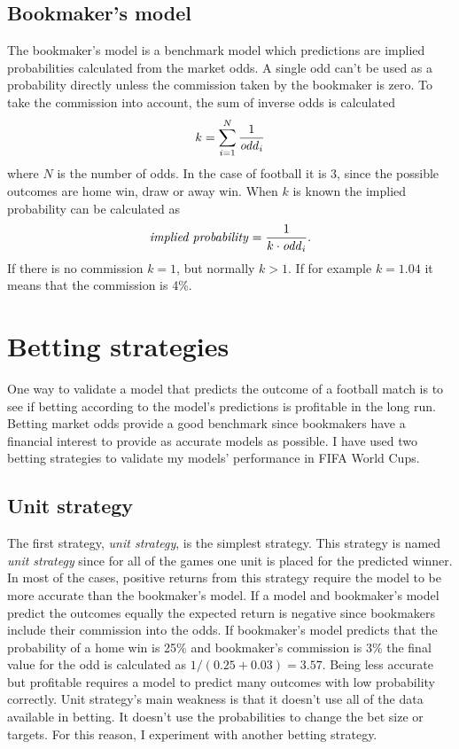 \subsection{Bookmaker's model}
The bookmaker's model is a benchmark model which predictions are implied probabilities calculated from the market odds. A single odd can't be used as a probability directly unless the commission taken by the bookmaker is zero. To take the commission into account, the sum of inverse odds is calculated
\begin{equation}
    k = \sum_{i=1}^{N}\frac{1}{\text{\textit{odd}}_i}
\end{equation}
where $N$ is the number of odds. In the case of football it is 3, since the possible outcomes are home win, draw or away win.
When $k$ is known the implied probability can be calculated as
\begin{equation}
    \text{\textit{implied probability}} = \frac{1}{k \cdot \text{\textit{odd}}_i}\text{.}
\end{equation}
If there is no commission $k=1$, but normally $k>1$. If for example $k=1.04$ it means that the commission is 4\%.

\section{Betting strategies}
One way to validate a model that predicts the outcome of a football match is to see if betting according to the model's predictions is profitable in the long run. Betting market odds provide a good benchmark since bookmakers have a financial interest to provide as accurate models as possible. I have used two betting strategies to validate my models' performance in FIFA World Cups.

\subsection{Unit strategy}
The first strategy, \textit{unit strategy}, is the simplest strategy. This strategy is named \textit{unit strategy} since for all of the games one unit is placed for the predicted winner. In most of the cases, positive returns from this strategy require the model to be more accurate than the bookmaker's model. If a model and bookmaker's model predict the outcomes equally the expected return is negative since bookmakers include their commission into the odds. If bookmaker's model predicts that the probability of a home win is 25\% and bookmaker's commission is 3\% the final value for the odd is calculated as $1/(0.25+0.03) = 3.57$. Being less accurate but profitable requires a model to predict many outcomes with low probability correctly. Unit strategy's main weakness is that it doesn't use all of the data available in betting. It doesn't use the probabilities to change the bet size or targets. For this reason, I experiment with another betting strategy.

